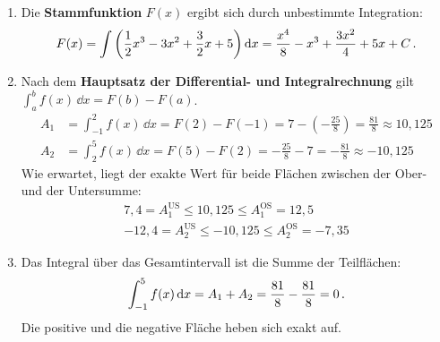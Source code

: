 \documentclass[ngerman]{scrreprt}
\newenvironment{loesungbox}[1]
  {\needspace{5\baselineskip}\begin{loesungboxstyle}[frametitle={#1}]}
  {\end{loesungboxstyle}}
\begin{document}
\begin{loesungbox}{Lösung zu \Cref{aufg:integral_fx_OS_US}}
\begin{enumerate}
    \item Die \textbf{Stammfunktion} $F(x)$ ergibt sich durch unbestimmte Integration:
    \begin{equation}\label{eq: stammfunktion_f}
        F(x) = \int \left(\frac{1}{2}x^{3}-3x^{2}+\frac{3}{2}x+5\right) \mathrm{d} x = \frac{x^{4}}{8}-x^{3}+\frac{3x^{2}}{4}+5x+C \,.
    \end{equation}
    
    \item Nach dem \textbf{Hauptsatz der Differential- und Integralrechnung} gilt \newline $\int_{a}^{b} f(x)\,\dd x = F(b)-F(a)$.
    \begin{align}
        A_1 &= \int_{-1}^{2} f(x)\,\dd x = F(2) - F(-1) = 7 - \left(-\frac{25}{8}\right) = \frac{81}{8} \approx 10,125 \\
        A_2 &= \int_{2}^{5} f(x)\,\dd x = F(5) - F(2) = -\frac{25}{8} - 7 = -\frac{81}{8} \approx -10,125
    \end{align}
    Wie erwartet, liegt der exakte Wert für beide Flächen zwischen der Ober- und der Untersumme:
    \begin{gather*}
        7,4 = A_{1}^{\text{US}} \le 10,125 \le A_{1}^{\text{OS}} = 12,5 \\
        -12,4 = A_{2}^{\text{US}} \le -10,125 \le A_{2}^{\text{OS}} = -7,35
    \end{gather*}
    
    \item Das Integral über das Gesamtintervall ist die Summe der Teilflächen:
    \begin{equation}
         \int_{-1}^{5}f(x)\,\mathrm{d} x = A_1 + A_2 = \frac{81}{8} - \frac{81}{8} = 0 \,.
    \end{equation}
    Die positive und die negative Fläche heben sich exakt auf.
\end{enumerate}
\end{loesungbox}
\end{document}
